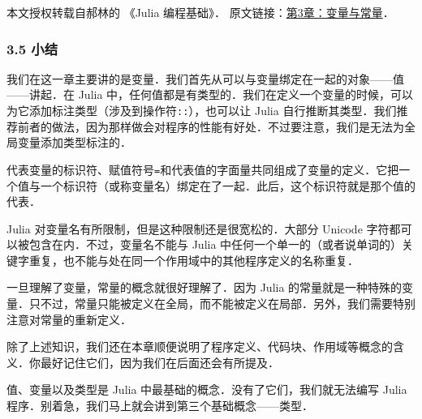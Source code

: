 
本文授权转载自郝林的 《Julia 编程基础》． 原文链接：\href{https://github.com/hyper0x/JuliaBasics/blob/master/book/ch03.md}{第3章：变量与常量}．


\subsubsection{3.5 小结}

我们在这一章主要讲的是变量．我们首先从可以与变量绑定在一起的对象——值——讲起．在 Julia 中，任何值都是有类型的．我们在定义一个变量的时候，可以为它添加标注类型（涉及到操作符\verb|::|），也可以让 Julia 自行推断其类型．我们推荐前者的做法，因为那样做会对程序的性能有好处．不过要注意，我们是无法为全局变量添加类型标注的．

代表变量的标识符、赋值符号\verb|=|和代表值的字面量共同组成了变量的定义．它把一个值与一个标识符（或称变量名）绑定在了一起．此后，这个标识符就是那个值的代表．

Julia 对变量名有所限制，但是这种限制还是很宽松的．大部分 Unicode 字符都可以被包含在内．不过，变量名不能与 Julia 中任何一个单一的（或者说单词的）关键字重复，也不能与处在同一个作用域中的其他程序定义的名称重复．

一旦理解了变量，常量的概念就很好理解了．因为 Julia 的常量就是一种特殊的变量．只不过，常量只能被定义在全局，而不能被定义在局部．另外，我们需要特别注意对常量的重新定义．

除了上述知识，我们还在本章顺便说明了程序定义、代码块、作用域等概念的含义．你最好记住它们，因为我们在后面还会有所提及．

值、变量以及类型是 Julia 中最基础的概念．没有了它们，我们就无法编写 Julia 程序．别着急，我们马上就会讲到第三个基础概念——类型．